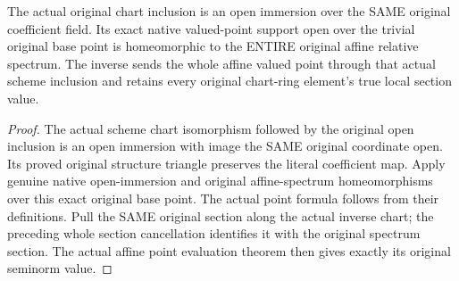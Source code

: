 \begin{theorem}
\label{thm:fc-native-rank-one-relative-charts}
\leanok
{}
The actual original chart inclusion is an open immersion over the SAME
original coefficient field. Its exact native valued-point support open
over the trivial original base point is homeomorphic to the ENTIRE
original affine relative spectrum. The inverse sends the whole affine
valued point through that actual scheme inclusion and retains every
original chart-ring element's true local section value.
\end{theorem}
\begin{proof}
The actual scheme chart isomorphism followed by the original open
inclusion is an open immersion with image the SAME original coordinate
open. Its proved original structure triangle preserves the literal
coefficient map. Apply genuine native open-immersion and original
affine-spectrum homeomorphisms over this exact original base point.
The actual point formula follows from their definitions. Pull the SAME
original section along the actual inverse chart; the preceding whole
section cancellation identifies it with the original spectrum section.
The actual affine point evaluation theorem then gives exactly its
original seminorm value.
\end{proof}
